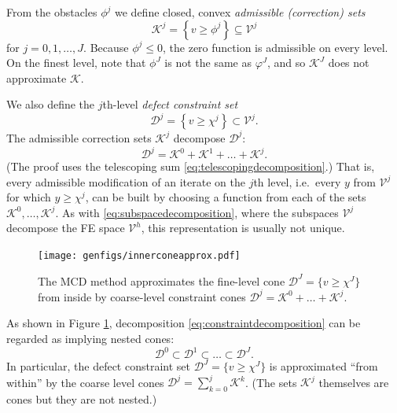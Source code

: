 \documentclass[letterpaper,final,12pt,reqno]{amsart}
\theoremstyle{claim}
\numberwithin{equation}{section}
\numberwithin{figure}{section}
\numberwithin{table}{section}
\numberwithin{theorem}{section}
\begin{document}
From the obstacles $\phi^j$ we define closed, convex \emph{admissible (correction) sets}
\begin{equation}
\mathcal{K}^j = \left\{v \ge \phi^j\right\} \subseteq \mathcal{V}^j \label{eq:defineKj}
\end{equation}
for $j=0,1,\dots,J$.  Because $\phi^j \le 0$, the zero function is admissible on every level.  On the finest level, note that $\phi^J$ is not the same as $\varphi^J$, and so $\mathcal{K}^J$ does not approximate $\mathcal{K}$.

We also define the $j$th-level \emph{defect constraint set}
\begin{equation}
  \mathcal{D}^j = \left\{v \ge \chi^j\right\} \subset \mathcal{V}^j.  \label{eq:constraintset}
\end{equation}
The admissible correction sets $\mathcal{K}^j$ decompose $\mathcal{D}^j$:
\begin{equation}
  \mathcal{D}^j = \mathcal{K}^0 + \mathcal{K}^1 + \dots + \mathcal{K}^j. \label{eq:constraintdecomposition}
\end{equation}
(The proof uses the telescoping sum \eqref{eq:telescopingdecomposition}.)  That is, every admissible modification of an iterate on the $j$th level, i.e.~every $y$ from $\mathcal{V}^j$ for which $y\ge \chi^j$, can be built by choosing a function from each of the sets $\mathcal{K}^0,\dots,\mathcal{K}^j$.  As with \eqref{eq:subspacedecomposition}, where the subspaces $\mathcal{V}^j$ decompose the FE space $\mathcal{V}^h$, this representation is usually not unique.

\begin{figure}
\texttt{[image: genfigs/innerconeapprox.pdf]}

\caption{The MCD method approximates the fine-level cone $\mathcal{D}^J = \{v\ge \chi^J\}$ from inside by coarse-level constraint cones $\mathcal{D}^j=\mathcal{K}^0+\dots+\mathcal{K}^j$.}
\label{fig:innerconeapprox}
\end{figure}

As shown in Figure \ref{fig:innerconeapprox}, decomposition \eqref{eq:constraintdecomposition} can be regarded as implying nested cones:
\begin{equation}
  \mathcal{D}^0 \subset \mathcal{D}^1 \subset \dots \subset \mathcal{D}^J.  \label{eq:nestedcones}
\end{equation}
In particular, the defect constraint set $\mathcal{D}^J = \{v \ge \chi^J\}$ is approximated ``from within'' by the coarse level cones $\mathcal{D}^j = \sum_{k=0}^j \mathcal{K}^k$.  (The sets $\mathcal{K}^j$ themselves are cones but they are not nested.)
\end{document}
